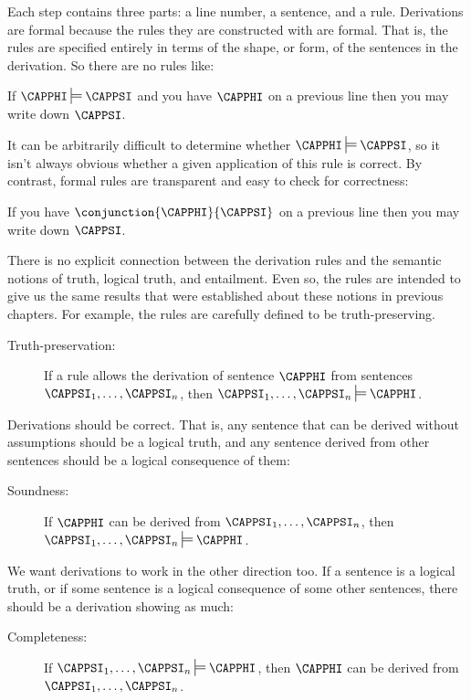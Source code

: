 Each step contains three parts: a line number, a sentence, and a rule.
Derivations are formal because the rules they are constructed with are formal.
That is, the rules are specified entirely in terms of the shape, or form, of the sentences in the derivation.
So there are no rules like: 
\begin{RESTARTmenumerate}
\item If $\CAPPHI\sdtstile{}{}\CAPPSI$ and you have $\CAPPHI$ on a previous line then you may write down $\CAPPSI$. 
\end{RESTARTmenumerate}
It can be arbitrarily difficult to determine whether $\CAPPHI\sdtstile{}{}\CAPPSI$, so it isn't always obvious whether a given application of this rule is correct.
By contrast, formal rules are transparent and easy to check for correctness: 
\begin{menumerate}
\item If you have $\conjunction{\CAPPHI}{\CAPPSI}$ on a previous line then you may write down $\CAPPSI$.
\end{menumerate} 

There is no explicit connection between the derivation rules and the semantic notions of truth, logical truth, and entailment. 
Even so, the rules are intended to give us the same results that were established about these notions in previous chapters.
For example, the rules are carefully defined to be truth-preserving. 
\begin{description}
\item[Truth-preservation:] If a rule allows the derivation of sentence $\CAPPHI$ from sentences $\CAPPSI_1,\ldots,\CAPPSI_{\integer{n}}$, then $\CAPPSI_1,\ldots,\CAPPSI_{\integer{n}}\sdtstile{}{}\CAPPHI$. 
\end{description} 
Derivations should be correct.
That is, any sentence that can be derived without assumptions should be a logical truth, and any sentence derived from other sentences should be a logical consequence of them:
\begin{description}
\item[Soundness:] If $\CAPPHI$ can be derived from $\CAPPSI_1,\ldots,\CAPPSI_{\integer{n}}$, then $\CAPPSI_1,\ldots,\CAPPSI_{\integer{n}}\sdtstile{}{}\CAPPHI$.
\end{description} 
\noindent{}We want derivations to work in the other direction too.
If a sentence is a logical truth, or if some sentence is a logical consequence of some other sentences, there should be a derivation showing as much:
\begin{description}
\item[Completeness:] If $\CAPPSI_1,\ldots,\CAPPSI_{\integer{n}}\sdtstile{}{}\CAPPHI$, then $\CAPPHI$ can be derived from $\CAPPSI_1,\ldots,\CAPPSI_{\integer{n}}$.
\end{description}

